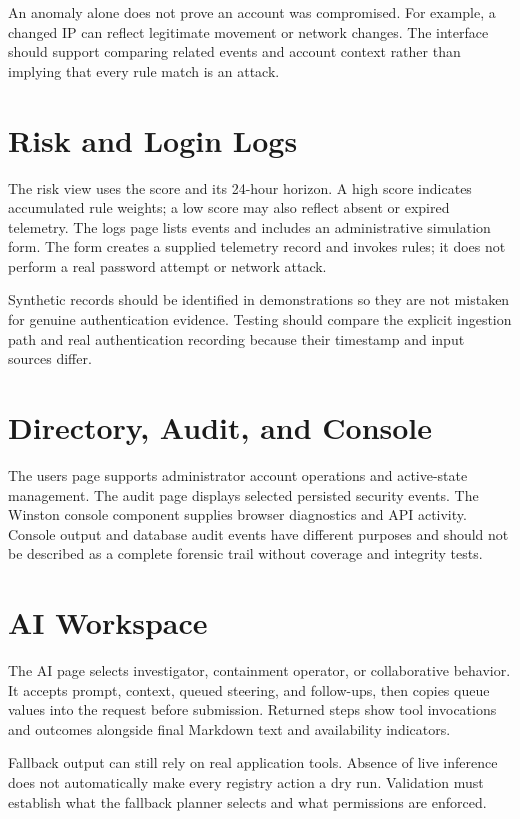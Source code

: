 An anomaly alone does not prove an account was compromised. For example, a changed IP can reflect legitimate movement or network changes. The interface should support comparing related events and account context rather than implying that every rule match is an attack.

\section{Risk and Login Logs}
The risk view uses the score and its 24-hour horizon. A high score indicates accumulated rule weights; a low score may also reflect absent or expired telemetry. The logs page lists events and includes an administrative simulation form. The form creates a supplied telemetry record and invokes rules; it does not perform a real password attempt or network attack.

Synthetic records should be identified in demonstrations so they are not mistaken for genuine authentication evidence. Testing should compare the explicit ingestion path and real authentication recording because their timestamp and input sources differ.

\section{Directory, Audit, and Console}
The users page supports administrator account operations and active-state management. The audit page displays selected persisted security events. The Winston console component supplies browser diagnostics and API activity. Console output and database audit events have different purposes and should not be described as a complete forensic trail without coverage and integrity tests.

\section{AI Workspace}
The AI page selects investigator, containment operator, or collaborative behavior. It accepts prompt, context, queued steering, and follow-ups, then copies queue values into the request before submission. Returned steps show tool invocations and outcomes alongside final Markdown text and availability indicators.

Fallback output can still rely on real application tools. Absence of live inference does not automatically make every registry action a dry run. Validation must establish what the fallback planner selects and what permissions are enforced.

